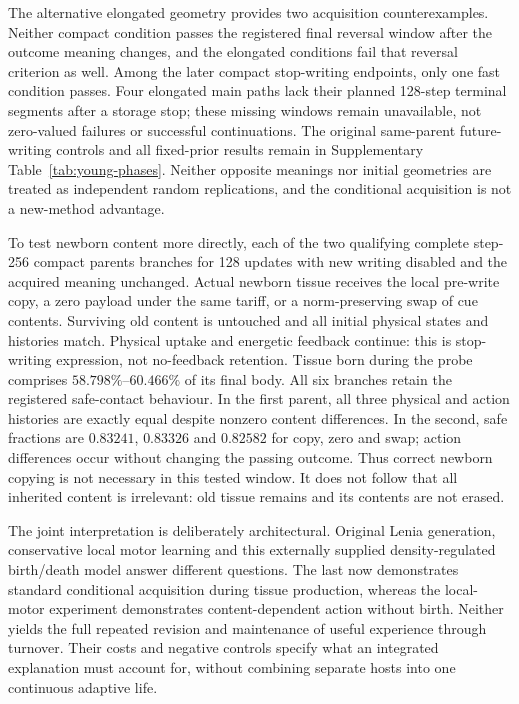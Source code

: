 The alternative elongated geometry provides two acquisition counterexamples. Neither compact condition passes the registered final reversal window after the outcome meaning changes, and the elongated conditions fail that reversal criterion as well. Among the later compact stop-writing endpoints, only one fast condition passes. Four elongated main paths lack their planned 128-step terminal segments after a storage stop; these missing windows remain unavailable, not zero-valued failures or successful continuations. The original same-parent future-writing controls and all fixed-prior results remain in Supplementary Table~\ref{tab:young-phases}. Neither opposite meanings nor initial geometries are treated as independent random replications, and the conditional acquisition is not a new-method advantage.

To test newborn content more directly, each of the two qualifying complete step-256 compact parents branches for 128 updates with new writing disabled and the acquired meaning unchanged. Actual newborn tissue receives the local pre-write copy, a zero payload under the same tariff, or a norm-preserving swap of cue contents. Surviving old content is untouched and all initial physical states and histories match. Physical uptake and energetic feedback continue: this is stop-writing expression, not no-feedback retention. Tissue born during the probe comprises $58.798\%$--$60.466\%$ of its final body. All six branches retain the registered safe-contact behaviour. In the first parent, all three physical and action histories are exactly equal despite nonzero content differences. In the second, safe fractions are $0.83241$, $0.83326$ and $0.82582$ for copy, zero and swap; action differences occur without changing the passing outcome. Thus correct newborn copying is not necessary in this tested window. It does not follow that all inherited content is irrelevant: old tissue remains and its contents are not erased.

The joint interpretation is deliberately architectural. Original Lenia generation, conservative local motor learning and this externally supplied density-regulated birth/death model answer different questions. The last now demonstrates standard conditional acquisition during tissue production, whereas the local-motor experiment demonstrates content-dependent action without birth. Neither yields the full repeated revision and maintenance of useful experience through turnover. Their costs and negative controls specify what an integrated explanation must account for, without combining separate hosts into one continuous adaptive life.

